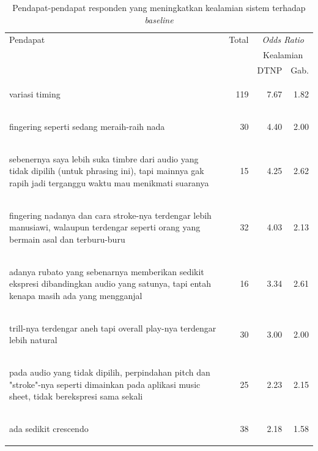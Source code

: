 \begin{table}[htbp]
  \begin{center}
	\caption{Pendapat-pendapat responden yang meningkatkan kealamian sistem terhadap \textit{baseline}}\label{tab-pendapat-oddsratio-morenatural}
	\begin{tabular}{|p{}|r|r|r|}
	\hline
Pendapat&	Total&	\multicolumn{2}{|c|}{\textit{Odds Ratio}}\\
&	&	\multicolumn{2}{|c|}{Kealamian}\\
\cline{3-4}
&	&	DTNP	&Gab.
\\\hline
\begin{intabquote}variasi timing\end{intabquote}&	119&	7.67&	1.82\\\hline
\begin{intabquote}fingering seperti sedang meraih-raih nada\end{intabquote}&	30&	4.40&	2.00\\\hline
\begin{intabquote}sebenernya saya lebih suka timbre dari audio yang tidak dipilih (untuk phrasing ini), tapi mainnya gak rapih jadi terganggu waktu mau menikmati suaranya\end{intabquote}&	15&	4.25&	2.62\\\hline
\begin{intabquote}fingering nadanya dan cara stroke-nya terdengar lebih manusiawi, walaupun terdengar seperti orang yang bermain asal dan terburu-buru\end{intabquote}&	32&	4.03&	2.13\\\hline
\begin{intabquote}adanya rubato yang sebenarnya memberikan sedikit ekspresi dibandingkan audio yang satunya, tapi entah kenapa masih ada yang mengganjal\end{intabquote}&	16&	3.34&	2.61\\\hline
\begin{intabquote}trill-nya terdengar aneh tapi overall play-nya terdengar lebih natural\end{intabquote}&	30&	3.00&	2.00\\\hline
\begin{intabquote}pada audio yang tidak dipilih, perpindahan pitch dan "stroke"-nya seperti dimainkan pada aplikasi music sheet, tidak berekspresi sama sekali\end{intabquote}&	25&	2.23&	2.15\\\hline
\begin{intabquote}ada sedikit crescendo\end{intabquote}&	38&	2.18&	1.58\\\hline

\end{tabular}
\end{center}
\end{table}
